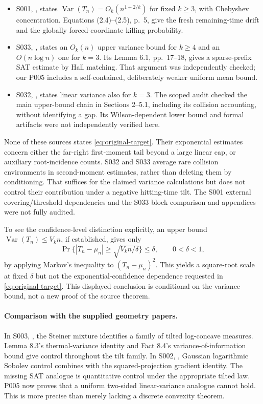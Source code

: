 \documentclass[11pt,a4paper]{article}
\begin{document}
\begin{itemize}
 \item S001, \citet[Theorem 1.3, p.~2]{carenini2026}, states
 $\operatorname{Var}(T_n)=O_k(n^{1+2/k})$ for fixed $k\ge3$,
 with Chebyshev concentration. Equations (2.4)--(2.5), p.~5, give
 the fresh remaining-time drift and the globally forced-coordinate
 killing probability.
 \item S033, \citet[Theorem 1.1, pp.~1--2; Corollary 5.2,
 pp.~16--17]{oaVariance}, states an $O_k(n)$ upper variance bound
 for $k\ge4$ and an $O(n\log n)$ one for $k=3$.
 Its Lemma 6.1, pp.~17--18, gives a sparse-prefix SAT estimate by
 Hall matching. That argument was independently checked; our P005
 includes a self-contained, deliberately weaker uniform mean bound.
 \item S032, \citet[Theorem 1.1, p.~1; Corollary 5.2,
 pp.~9--10]{oaVariance3}, states linear variance also for $k=3$.
 The scoped audit checked the main upper-bound chain in Sections
 2--5.1, including its collision accounting, without identifying a gap.
 Its Wilson-dependent lower bound and formal artifacts were not
 independently verified here.
\end{itemize}
None of these sources states \eqref{eq:original-target}. Their exponential
estimates concern either the far-right first-moment tail beyond a large
linear cap, or auxiliary root-incidence counts. S032 and S033 average rare
collision environments in second-moment estimates, rather than deleting them by
conditioning. That suffices for the claimed variance calculations but
does not control their contribution under a negative hitting-time tilt.
The S001 external covering/threshold dependencies and the S033 block
comparison and appendices were not fully audited.

To see the confidence-level distinction explicitly, an upper bound
$\operatorname{Var}(T_n)\le V_k n$, if established, gives only
\[
 \Pr\{|T_n-\mu_n|\ge\sqrt{V_k n/\delta}\}\le\delta,
 \qquad 0<\delta<1,
\]
by applying Markov's inequality to $(T_n-\mu_n)^2$.
This yields a square-root scale at fixed $\delta$ but not
the exponential-confidence dependence requested in
\eqref{eq:original-target}. This displayed conclusion is conditional
on the variance bound, not a new proof of the source theorem.

\paragraph{Comparison with the supplied geometry papers.}
In S003, \citet[Sections 8.2--8.6, pp.~223--227]{lotz2026}, the Steiner
mixture identifies a family of tilted log-concave measures. Lemma 8.3's
thermal-variance identity and Fact 8.4's variance-of-information bound
give control throughout the tilt family. In S002,
\citet[Appendix E.3, pp.~290--293]{almt2014}, Gaussian logarithmic
Sobolev control combines with the squared-projection gradient identity.
The missing SAT analogue is quantitative control under the appropriate
tilted law. P005 now proves that a uniform two-sided linear-variance
analogue cannot hold. This is more precise than merely lacking a
discrete convexity theorem.
\end{document}
